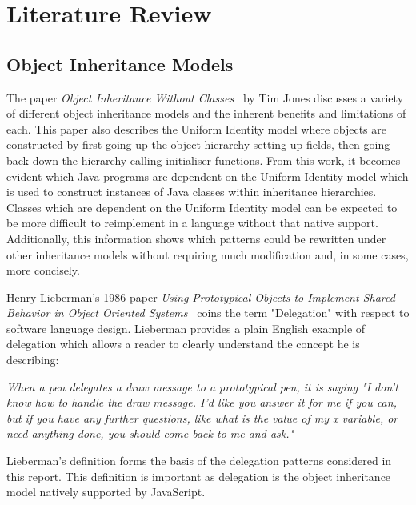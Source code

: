 \chapter{Literature Review}\label{C:us}
\section{Object Inheritance Models}
The paper \textit{Object Inheritance Without Classes~\cite{InheritanceWithoutClasses}} by Tim Jones discusses a variety of different object inheritance models and the inherent benefits and limitations of each. This paper also describes the Uniform Identity model where objects are constructed by first going up the object hierarchy setting up fields, then going back down the hierarchy calling initialiser functions. From this work, it becomes evident which Java programs are dependent on the Uniform Identity model which is used to construct instances of Java classes within inheritance hierarchies. Classes which are dependent on the Uniform Identity model can be expected to be more difficult to reimplement in a language without that native support. Additionally, this information shows which patterns could be rewritten under other inheritance models without requiring much modification and, in some cases, more concisely.
\newline

Henry Lieberman's 1986 paper \textit{Using Prototypical Objects to Implement Shared Behavior in Object Oriented Systems~\cite{UsingPrototypicalObjects}} coins the term "Delegation" with respect to software language design. Lieberman provides a plain English example of delegation which allows a reader to clearly understand the concept he is describing:
\begin{displayquote}\textit{
	When a pen delegates a draw message to a prototypical pen, it is saying "I don't know how to handle the draw message. I'd like you answer it for me if you can, but if you have any further questions, like what is the value of my x variable, or need anything done, you should come back to me and ask."~\cite{UsingPrototypicalObjects}}
\end{displayquote}
Lieberman's definition forms the basis of the delegation patterns considered in this report. This definition is important as delegation is the object inheritance model natively supported by JavaScript.
\newline

